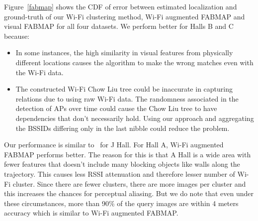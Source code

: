 Figure~\ref{fabmap} shows the CDF of error between estimated localization and ground-truth of our Wi-Fi clustering method, Wi-Fi augmented FABMAP and visual FABMAP for all four datasets. We perform better for Halls B and C because:
\begin{itemize}
\item In some instances, the high similarity in visual features from physically different locations causes the algorithm to make the wrong matches even with the Wi-Fi data.
\item The constructed Wi-Fi Chow Liu tree could be inaccurate in capturing relations due to using raw Wi-Fi data.
The randomness associated in the detection of APs over time could cause the Chow Liu tree to have dependencies that don't necessarily hold.
Using our approach and aggregating the BSSIDs differing only in the last nibble could reduce the problem.
\end{itemize}
Our performance is similar to~\cite{visual_wifi_2} for J Hall. For Hall A, Wi-Fi augmented FABMAP performs better. The reason for this is that A Hall is a wide area with fewer features that doesn't include many blocking objects like walls along the trajectory. This causes less RSSI attenuation and therefore lesser number of Wi-Fi cluster. Since there are fewer clusters, there are more images per cluster and this increases the chances for perceptual aliasing. But we do note that even under these circumstances, more than 90\% of the query images are within 4 meters accuracy which is similar to Wi-Fi augmented FABMAP.

